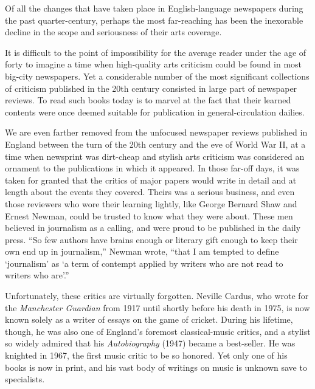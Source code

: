 \documentclass[12pt,a4paper]{article}
\begin{document}
\begin{reading}

\begin{examtext}
Of all the changes that have taken place in English-language newspapers during the past quarter-century, perhaps the most far-reaching has been the inexorable decline in the scope and seriousness of their arts coverage.

It is difficult to the point of impossibility for the average reader under the age of forty to imagine a time when high-quality arts criticism could be found in most big-city newspapers. Yet a considerable number of the most significant collections of criticism published in the 20th century consisted in large part of newspaper reviews. To read such books today is to marvel at the fact that their learned contents were once deemed suitable for publication in general-circulation dailies.

We are even farther removed from the unfocused newspaper reviews published in England between the turn of the 20th century and the eve of World War II, at a time when newsprint was dirt-cheap and stylish arts criticism was considered an ornament to the publications in which it appeared. In those far-off days, it was taken for granted that the critics of major papers would write in detail and at length about the events they covered. Theirs was a serious business, and even those reviewers who wore their learning lightly, like George Bernard Shaw and Ernest Newman, could be trusted to know what they were about. These men believed in journalism as a calling, and were proud to be published in the daily press. ``So few authors have brains enough or literary gift enough to keep their own end up in journalism,'' Newman wrote, ``that I am tempted to define `journalism' as `a term of contempt applied by writers who are not read to writers who are'.''

Unfortunately, these critics are virtually forgotten. Neville Cardus, who wrote for the \textit{Manchester Guardian} from 1917 until shortly before his death in 1975, is now known solely as a writer of essays on the game of cricket. During his lifetime, though, he was also one of England's foremost classical-music critics, and a stylist so widely admired that his \textit{Autobiography} (1947) became a best-seller. He was knighted in 1967, the first music critic to be so honored. Yet only one of his books is now in print, and his vast body of writings on music is unknown save to specialists.


\end{examtext}
\end{reading}
\end{document}
